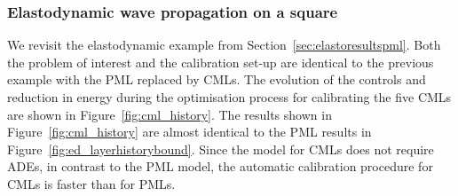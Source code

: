 \documentclass[a4paper]{article}
\begin{document}
\subsubsection{Elastodynamic wave propagation on a square}
\label{sec:cmlsquare}

We revisit the elastodynamic example from
Section~\ref{sec:elastoresultspml}. Both the problem of interest and the
calibration set-up are identical to the previous example with the PML
replaced by CMLs. The evolution of the controls and reduction in energy
during the optimisation process for calibrating the five CMLs are shown in
Figure~\ref{fig:cml_history}. The results shown in
Figure~\ref{fig:cml_history} are almost identical to the PML results
in Figure~\ref{fig:ed_layerhistorybound}. Since the model for CMLs
does not require ADEs, in contrast to the PML model, the automatic
calibration procedure for CMLs is faster than for PMLs.
\end{document}
